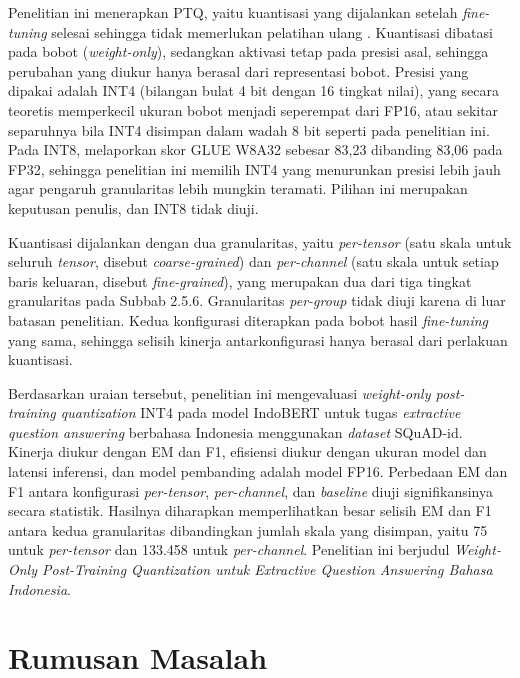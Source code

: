 Penelitian ini menerapkan PTQ, yaitu kuantisasi yang dijalankan setelah \textit{fine-tuning} selesai sehingga tidak memerlukan pelatihan ulang \parencite{gholami2021survey}. Kuantisasi dibatasi pada bobot (\textit{weight-only}), sedangkan aktivasi tetap pada presisi asal, sehingga perubahan yang diukur hanya berasal dari representasi bobot. Presisi yang dipakai adalah INT4 (bilangan bulat 4 bit dengan 16 tingkat nilai), yang secara teoretis memperkecil ukuran bobot menjadi seperempat dari FP16, atau sekitar separuhnya bila INT4 disimpan dalam wadah 8 bit seperti pada penelitian ini. Pada INT8, \textcite{bondarenko2021understanding} melaporkan skor GLUE W8A32 sebesar 83,23 dibanding 83,06 pada FP32, sehingga penelitian ini memilih INT4 yang menurunkan presisi lebih jauh agar pengaruh granularitas lebih mungkin teramati. Pilihan ini merupakan keputusan penulis, dan INT8 tidak diuji.

Kuantisasi dijalankan dengan dua granularitas, yaitu \textit{per-tensor} (satu skala untuk seluruh \textit{tensor}, disebut \textit{coarse-grained}) dan \textit{per-channel} (satu skala untuk setiap baris keluaran, disebut \textit{fine-grained}), yang merupakan dua dari tiga tingkat granularitas pada Subbab 2.5.6. Granularitas \textit{per-group} tidak diuji karena di luar batasan penelitian. Kedua konfigurasi diterapkan pada bobot hasil \textit{fine-tuning} yang sama, sehingga selisih kinerja antarkonfigurasi hanya berasal dari perlakuan kuantisasi.

Berdasarkan uraian tersebut, penelitian ini mengevaluasi \textit{weight-only post-training quantization} INT4 pada model IndoBERT untuk tugas \textit{extractive question answering} berbahasa Indonesia menggunakan \textit{dataset} SQuAD-id. Kinerja diukur dengan EM dan F1, efisiensi diukur dengan ukuran model dan latensi inferensi, dan model pembanding adalah model FP16. Perbedaan EM dan F1 antara konfigurasi \textit{per-tensor}, \textit{per-channel}, dan \textit{baseline} diuji signifikansinya secara statistik. Hasilnya diharapkan memperlihatkan besar selisih EM dan F1 antara kedua granularitas dibandingkan jumlah skala yang disimpan, yaitu 75 untuk \textit{per-tensor} dan 133.458 untuk \textit{per-channel}. Penelitian ini berjudul \textit{Weight-Only Post-Training Quantization untuk Extractive Question Answering Bahasa Indonesia}.

\section{Rumusan Masalah}

